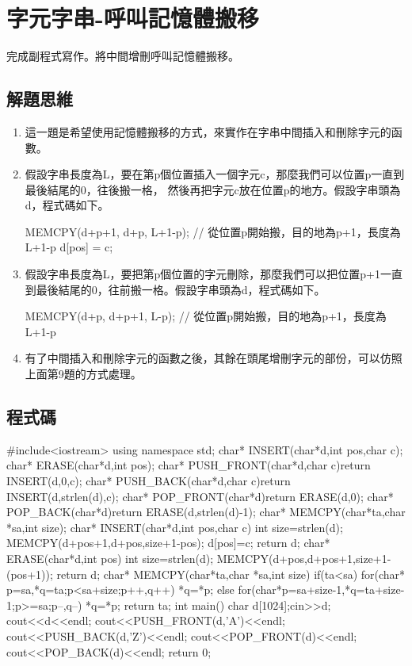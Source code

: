 \section{字元字串-呼叫記憶體搬移}
完成副程式寫作。將中間增刪呼叫記憶體搬移。

\subsection{解題思維}

\vspace{0.3cm}
\begin{enumerate}
	\item 這一題是希望使用記憶體搬移的方式，來實作在字串中間插入和刪除字元的函數。
	\item 假設字串長度為L，要在第p個位置插入一個字元c，那麼我們可以位置p一直到最後結尾的0，往後搬一格，
	然後再把字元c放在位置p的地方。假設字串頭為d，程式碼如下。
	\begin{inside}
		MEMCPY(d+p+1, d+p, L+1-p); // 從位置p開始搬，目的地為p+1，長度為L+1-p
		d[pos] = c;
	\end{inside}
	\item 假設字串長度為L，要把第p個位置的字元刪除，那麼我們可以把位置p+1一直到最後結尾的0，往前搬一格。假設字串頭為d，程式碼如下。
	\begin{inside}
	MEMCPY(d+p, d+p+1, L-p); // 從位置p開始搬，目的地為p+1，長度為L+1-p
	\end{inside}
	\item 有了中間插入和刪除字元的函數之後，其餘在頭尾增刪字元的部份，可以仿照上面第9題的方式處理。
\end{enumerate}


\subsection{程式碼}
\begin{cppcode}
#include<iostream>
using namespace std; 
char* INSERT(char*d,int pos,char c);
char* ERASE(char*d,int pos);
char* PUSH_FRONT(char*d,char c){return INSERT(d,0,c);}
char* PUSH_BACK(char*d,char c){return INSERT(d,strlen(d),c);}
char* POP_FRONT(char*d){return ERASE(d,0);}
char* POP_BACK(char*d){return ERASE(d,strlen(d)-1);}
char* MEMCPY(char*ta,char *sa,int size);
char* INSERT(char*d,int pos,char c){
	int size=strlen(d);
	MEMCPY(d+pos+1,d+pos,size+1-pos);
	d[pos]=c;
	return d;
}
char* ERASE(char*d,int pos){
	int size=strlen(d);
	MEMCPY(d+pos,d+pos+1,size+1-(pos+1));
	return d;
}
char* MEMCPY(char*ta,char *sa,int size){
	if(ta<sa) for(char* p=sa,*q=ta;p<sa+size;p++,q++) *q=*p;
	else for(char*p=sa+size-1,*q=ta+size-1;p>=sa;p--,q--) *q=*p;
	return ta;
}
int main(){ 
	char d[1024];cin>>d;
	cout<<d<<endl;
	cout<<PUSH_FRONT(d,'A')<<endl;
	cout<<PUSH_BACK(d,'Z')<<endl;
	cout<<POP_FRONT(d)<<endl;
	cout<<POP_BACK(d)<<endl;
	return 0;
}
\end{cppcode}


